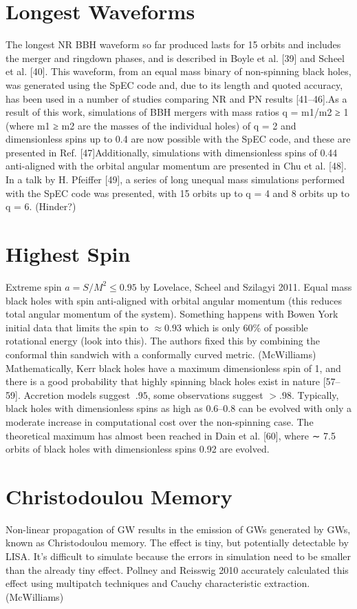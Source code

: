 \section{Longest Waveforms}
The longest NR BBH waveform so far produced lasts for 15 orbits and includes the merger and ringdown phases, and is described in Boyle et al. [39] and Scheel et al. [40]. This waveform, from an equal mass binary of non-spinning black holes, was generated using the SpEC code and, due to its length and quoted accuracy, has been used in a number of studies comparing NR and PN results [41–46].As a result of this work, simulations of BBH mergers with mass ratios q = m1/m2 ≥ 1 (where m1 ≥ m2 are the masses of the individual holes) of q = 2 and dimensionless spins up to 0.4 are now possible with the SpEC code, and these are presented in Ref. [47]Additionally, simulations with dimensionless spins of 0.44 anti-aligned with the orbital angular momentum are presented in Chu et al. [48]. In a talk by H. Pfeiffer [49], a series of long unequal mass simulations performed with the SpEC code was presented, with 15 orbits up to q = 4 and 8 orbits up to q = 6. (Hinder?)

\section{Highest Spin}
Extreme spin $a=S/M^2 \leq 0.95$ by Lovelace, Scheel and Szilagyi 2011. Equal mass black holes with spin anti-aligned with orbital angular momentum (this reduces total angular momentum of the system). Something happens with Bowen York initial data that limits the spin to $\approx 0.93$ which is only 60\% of possible rotational energy (look into this). The authors fixed this by combining the conformal thin sandwich with a conformally curved metric. (McWilliams)
Mathematically, Kerr black holes have a maximum dimensionless spin of 1, and there is a good probability that highly spinning black holes exist in nature [57–59]. Accretion models suggest $~.95$, some observations suggest $>.98$. Typically, black holes with dimensionless spins as high as 0.6–0.8 can be evolved with only a moderate increase in computational cost over the non-spinning case. The theoretical maximum has almost been reached in Dain et al. [60], where ∼ 7.5 orbits of black holes with dimensionless spins 0.92 are evolved. 

\section{Christodoulou Memory}
Non-linear propagation of GW results in the emission of GWs generated by GWs, known as Christodoulou memory.  The effect is tiny, but potentially detectable by LISA. It's difficult to simulate because the errors in simulation need to be smaller than the already tiny effect. Pollney and Reisswig 2010 accurately calculated this effect using multipatch techniques and Cauchy characteristic extraction. (McWilliams)

